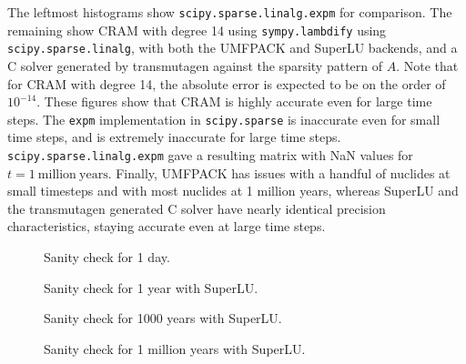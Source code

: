 The leftmost histograms show
\texttt{scipy.\allowbreak{}sparse.\allowbreak{}linalg.\allowbreak{}expm} for
comparison. The remaining show CRAM with degree 14 using
\texttt{sympy.\allowbreak{}lambdify} using
\texttt{scipy.\allowbreak{}sparse.\allowbreak{}linalg}, with both the UMFPACK
and SuperLU backends, and a C solver generated by transmutagen against the
sparsity pattern of $A$. Note that for CRAM with degree 14, the absolute error
is expected to be on the order of $10^{-14}$. These figures show that CRAM is
highly accurate even for large time steps. The \texttt{expm} implementation in
\texttt{scipy.\allowbreak{}sparse} is inaccurate even for small time steps,
and is extremely inaccurate for large time steps.
\texttt{scipy.\allowbreak{}sparse.\allowbreak{}linalg.\allowbreak{}expm} gave
a resulting matrix with NaN values for $t = 1 \mathrm{\ million\ years}$.
Finally, UMFPACK has issues with a handful of nuclides at small timesteps and
with most nuclides at 1 million years, whereas SuperLU and the transmutagen
generated C solver have nearly identical precision characteristics, staying
accurate even at large time steps.

\begin{figure}[!ht]
\centering
\resizebox{0.9\textwidth}{!}{}
\caption{Sanity check for 1 day.}
\label{fig:nofission-pwru50-1-day}
\end{figure}

\begin{figure}[!ht]
\centering
\resizebox{0.9\textwidth}{!}{}
\caption{Sanity check for 1 year with SuperLU.}
\label{fig:nofission-pwru50-1-year}
\end{figure}

\begin{figure}[!ht]
\centering
\resizebox{0.9\textwidth}{!}{}
\caption{Sanity check for 1000 years with SuperLU.}
\label{fig:nofission-pwru50-1000-years}
\end{figure}

\begin{figure}[!ht]
\centering
\resizebox{0.9\textwidth}{!}{}
\caption{Sanity check for 1 million years with SuperLU.}
\label{fig:nofission-pwru50-1-million-years}
\end{figure}
